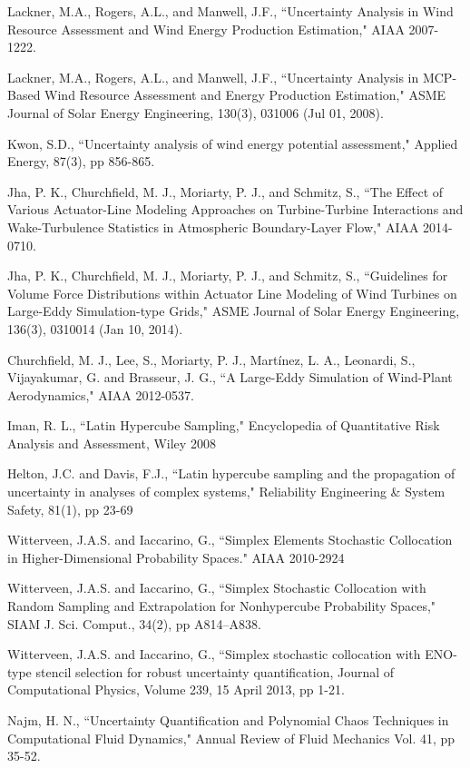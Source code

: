 \documentclass[]{aiaa-tc}%
\begin{document}
\begin{thebibliography}{9}%

Lackner, M.A., Rogers, A.L., and Manwell, J.F., ``Uncertainty Analysis in Wind Resource Assessment and Wind Energy Production Estimation," AIAA 2007-1222.

Lackner, M.A., Rogers, A.L., and Manwell, J.F., ``Uncertainty Analysis in MCP-Based Wind Resource Assessment and Energy Production Estimation," ASME Journal of Solar Energy Engineering, 130(3), 031006 (Jul 01, 2008).

Kwon, S.D., ``Uncertainty analysis of wind energy potential assessment," Applied Energy, 87(3), pp 856-865.

Jha, P. K., Churchfield, M. J., Moriarty, P. J., and Schmitz, S., ``The Effect of Various Actuator-Line   Modeling Approaches on Turbine-Turbine Interactions and Wake-Turbulence Statistics in Atmospheric Boundary-Layer Flow," AIAA 2014-0710.

Jha, P. K., Churchfield, M. J., Moriarty, P. J., and Schmitz, S., ``Guidelines for Volume Force  Distributions within Actuator Line Modeling of Wind Turbines on Large-Eddy Simulation-type Grids," ASME Journal of Solar Energy Engineering, 136(3), 0310014 (Jan 10, 2014).

Churchfield, M. J., Lee, S., Moriarty, P. J., Martínez, L. A., Leonardi, S., Vijayakumar, G. and  Brasseur, J. G., ``A Large-Eddy Simulation of Wind-Plant Aerodynamics," AIAA 2012-0537.

Iman, R. L., ``Latin Hypercube Sampling," Encyclopedia of Quantitative Risk Analysis and Assessment, Wiley 2008

Helton, J.C. and Davis, F.J., ``Latin hypercube sampling and the propagation of uncertainty in analyses of complex systems," Reliability Engineering \& System Safety, 81(1), pp 23-69

Witterveen, J.A.S. and Iaccarino, G., ``Simplex Elements Stochastic Collocation in Higher-Dimensional Probability Spaces." AIAA 2010-2924

Witterveen, J.A.S. and Iaccarino, G., ``Simplex Stochastic Collocation with Random Sampling and Extrapolation for Nonhypercube Probability Spaces," SIAM J. Sci. Comput., 34(2), pp A814–A838.

Witterveen, J.A.S. and Iaccarino, G., ``Simplex stochastic collocation with ENO-type stencil selection for robust uncertainty quantification, Journal of Computational Physics, Volume 239, 15 April 2013, pp 1-21.

Najm, H. N., ``Uncertainty Quantification and Polynomial Chaos Techniques in Computational Fluid Dynamics," Annual Review of Fluid Mechanics
Vol. 41, pp 35-52. 


\end{thebibliography}
\end{document}
